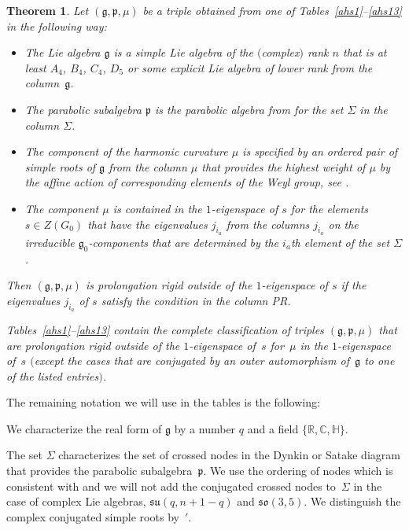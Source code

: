 \documentclass[10pt,a4paper]{amsart}
\newcommand{\fg}{\mathfrak g}
\newcommand{\fp}{\mathfrak p}
\numberwithin{equation}{section}
\newtheorem{Theorem}{Theorem}[section]
\begin{document}
\begin{Theorem} \label{t3.5}
Let $(\fg,\fp,\mu)$ be a triple obtained from one of Tables~{\rm \ref{ahs1}--\ref{ahs13}} in the following way:
\begin{itemize}\itemsep=0pt
\item The Lie algebra $\fg$ is a simple Lie algebra of the $($complex$)$ rank $n$ that is at least $A_4$, $B_4$, $C_4$, $D_5$ or some explicit Lie algebra of lower rank from the column~$\fg$.
\item The parabolic subalgebra $\fp$ is the parabolic algebra from {\rm \cite[Section 3.2.9]{parabook}} for the set $\Sigma$ in the column $\Sigma$.
\item The component of the harmonic curvature $\mu$ is specified by an ordered pair of simple roots of $\fg$ from the column $\mu$ that provides the highest weight of $\mu$ by the affine action of corresponding elements of the Weyl group, see {\rm \cite[Theorem 3.3.5]{parabook}}.
\item The component $\mu$ is contained in the $1$-eigenspace of $s$ for the elements $s\in Z(G_0)$ that have the eigenvalues $j_{i_a}$ from the columns $j_{i_a}$ on the irreducible $\fg_0$-components that are determined by the $i_a$th element of the set $\Sigma$.
\end{itemize}
Then $(\fg,\fp,\mu)$ is prolongation rigid outside of the $1$-eigenspace of $s$ if the eigenvalues $j_{i_a}$ of $s$ satisfy the condition in the column PR.

Tables~{\rm \ref{ahs1}--\ref{ahs13}} contain the complete classification of triples $(\fg,\fp,\mu)$ that are prolongation rigid outside of the $1$-eigenspace of~$s$ for~$\mu$ in the $1$-eigenspace of~$s$ $($except the cases that are conjugated by an outer automorphism of~$\fg$ to one of the listed entries$)$.
\end{Theorem}

The remaining notation we will use in the tables is the following:

We characterize the real form of $\fg$ by a number $q$ and a f\/ield $\{\mathbb{R, C, H}\}$.

The set $\Sigma$ characterizes the set of crossed nodes in the Dynkin or Satake diagram that provides the parabolic subalgebra~$\fp$. We use the ordering of nodes which is consistent with \cite[Appendix~B]{parabook} and we will not add the conjugated crossed nodes to~$\Sigma$ in the case of complex Lie algebras, $\mathfrak{su}(q,n+1-q)$ and $\mathfrak{so}(3,5)$. We distinguish the complex conjugated simple roots by~$'$.
\end{document}
